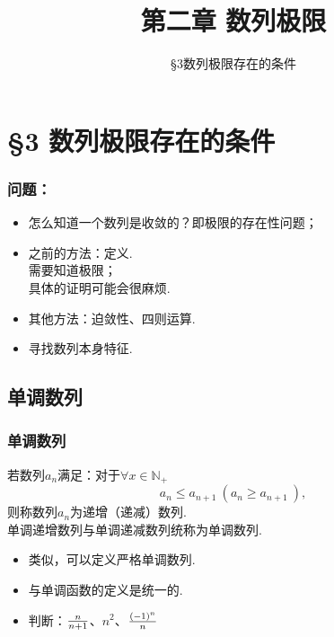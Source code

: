 \documentclass[mathserif]{beamer}
\title
{第二章 \qquad 数列极限}
\author{}
\date{\sihao \S 3\qquad 数列极限存在的条件}
\begin{document}
	
\setlength\abovedisplayskip{2pt}
\setlength\belowdisplayskip{2pt}

\begin{frame}
\Background
\titlepage  %
\end{frame}




\section{\S 3  数列极限存在的条件}


\begin{frame}
\frametitle{问题：}
\begin{itemize}
\item 怎么知道一个数列是收敛的？即极限的存在性问题；
\jiange
\item 之前的方法：定义.\\
\suojin 需要知道极限；\\
\suojin 具体的证明可能会很麻烦.
\item 其他方法：迫敛性、四则运算.
\item 寻找数列本身特征.
\end{itemize}
\end{frame}


\begin{frame}
\tableofcontents
\end{frame}




\subsection{单调数列}
\begin{frame}
\frametitle{单调数列}
\begin{dfn}
\suojin 若数列$a_n$满足：对于$\forall x\in\mathbb{N}_{+}$
$$a_n\leqslant a_{n+1}\ (a_n\geqslant a_{n+1}\ ),$$
则称数列$a_n$为递增（递减）数列.\\
\suojin 单调递增数列与单调递减数列统称为单调数列.
\end{dfn}
\begin{itemize}
\item 类似，可以定义严格单调数列.
\item 与单调函数的定义是统一的.
\item 判断：$\frac{n}{n+1}$、$n^{2}$、$\frac{(-1)^{n}}{n}$\jh
\end{itemize}
\end{frame}
\end{document}
